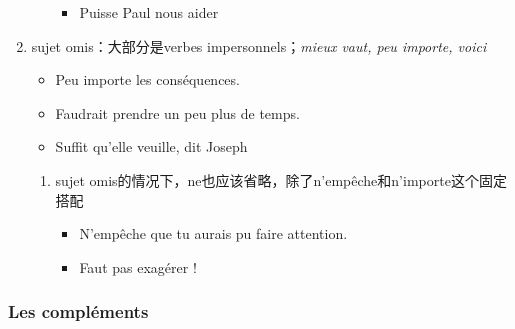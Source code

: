 \documentclass[UTF8]{report}
\begin{document}
\begin{enumerate}
\begin{enumerate}
\begin{itemize}
            \item Puisse Paul nous aider
        \end{itemize}
    \end{enumerate}
    \item sujet omis：大部分是verbes impersonnels；\textit{mieux vaut, peu importe, voici}
    \begin{itemize}
        \item Peu importe les conséquences.
        \item Faudrait prendre un peu plus de temps.
        \item Suffit qu’elle veuille, dit Joseph
    \end{itemize}
    \begin{enumerate}
        \item sujet omis的情况下，ne也应该省略，除了n’empêche和n’importe这个固定搭配
        \begin{itemize}
            \item N’empêche que tu aurais pu faire attention.
            \item Faut pas exagérer !
        \end{itemize}
    \end{enumerate}
\end{enumerate}

\subsubsection{Les compléments}
\end{document}
